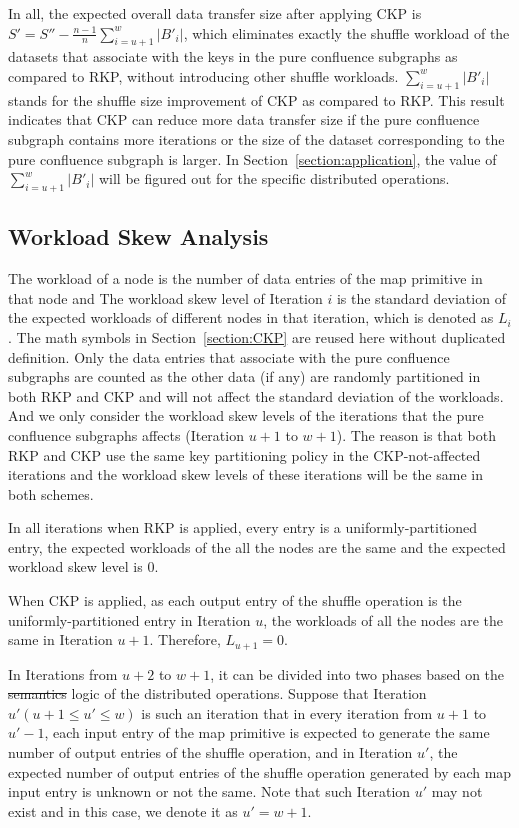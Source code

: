 \documentclass[10pt,journal,compsoc]{IEEEtran}
\begin{document}
In all, the expected overall data transfer size after applying CKP 
is $S'=S''- \frac{n-1}{n}\sum_{i=u+1}^w |B'_i|$, 
which eliminates exactly the shuffle workload of the datasets that associate with the keys in the pure confluence subgraphs as compared to RKP, without introducing other shuffle workloads. 
$\sum_{i=u+1}^w |B'_i|$ stands for the shuffle size improvement of CKP as compared to RKP.
This result indicates that CKP can reduce more data transfer size 
if the pure confluence subgraph contains more iterations 
or the size of the dataset corresponding to the pure confluence subgraph is larger. 
In Section~\ref{section:application}, the value of $\sum_{i=u+1}^w |B'_i|$ will be figured out for the specific distributed operations.


\subsection{Workload Skew Analysis}\label{section:skew}
The workload of a node is the number of data entries of the map primitive in that node and 
The workload skew level of Iteration $i$ is the standard deviation of the expected workloads of different nodes in that iteration, which is denoted as $L_i$. 
The math symbols in Section~\ref{section:CKP} are reused here without duplicated definition. 
Only the data entries that associate with the pure confluence subgraphs are counted as the other data (if any) are randomly partitioned in both RKP and CKP and will not affect the standard deviation of the workloads.
And we only consider the workload skew levels of the iterations that the pure confluence subgraphs affects (Iteration $u+1$ to $w+1$).
The reason is that both RKP and CKP use the same key partitioning policy in the CKP-not-affected iterations and the workload skew levels of these iterations will be the same in both schemes.


In all iterations when RKP is applied, every entry is a uniformly-partitioned entry, the expected workloads of the all the nodes are the same and the expected workload skew level is 0. 

When CKP is applied, as each output entry of the shuffle operation is the uniformly-partitioned entry in Iteration $u$, the workloads of all the nodes are the same in Iteration $u+1$. 
Therefore, $L_{u+1}=0$.

In Iterations from $u+2$ to $w+1$, 
it can be divided into two phases based on the \st{semantics} logic of the distributed operations. 
Suppose that Iteration $u' (u+1 \leq u' \leq w)$ is such an iteration that in every iteration from $u+1$ to $u'-1$, each input entry of the map primitive is expected to generate the same number of output entries of the shuffle operation, and in Iteration $u'$, the expected number of output entries of the shuffle operation generated by each map input entry is unknown or not the same. 
Note that such Iteration $u'$ may not exist and in this case, we denote it as $u'=w+1$. 
\end{document}

